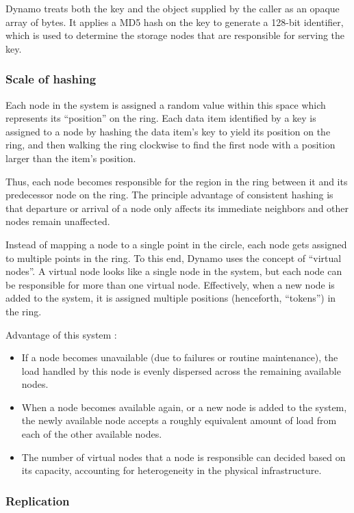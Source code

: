 Dynamo treats both the key and the object supplied by the caller
as an opaque array of bytes. It applies a MD5 hash on the key to
generate a 128-bit identifier, which is used to determine the
storage nodes that are responsible for serving the key. 

\subsubsection{Scale of hashing}

Each node in the
system is assigned a random value within this space which
represents its “position” on the ring. Each data item identified by
a key is assigned to a node by hashing the data item’s key to yield
its position on the ring, and then walking the ring clockwise to
find the first node with a position larger than the item’s position. 

Thus, each node becomes responsible for the region in the ring
between it and its predecessor node on the ring. The principle
advantage of consistent hashing is that departure or arrival of a
node only affects its immediate neighbors and other nodes remain
unaffected. 

Instead of mapping a node to a single point in the circle, each node gets
assigned to multiple points in the ring. To this end, Dynamo uses
the concept of “virtual nodes”. A virtual node looks like a single
node in the system, but each node can be responsible for more
than one virtual node. Effectively, when a new node is added to
the system, it is assigned multiple positions (henceforth, “tokens”)
in the ring. 

Advantage of this system :

\begin{itemize}
\item If a node becomes unavailable (due to failures or routine
maintenance), the load handled by this node is evenly
dispersed across the remaining available nodes. 
\item When a node becomes available again, or a new node is
added to the system, the newly available node accepts a
roughly equivalent amount of load from each of the other
available nodes. 
\item The number of virtual nodes that a node is responsible can
decided based on its capacity, accounting for heterogeneity
in the physical infrastructure.
\end{itemize}

\subsubsection{Replication}

